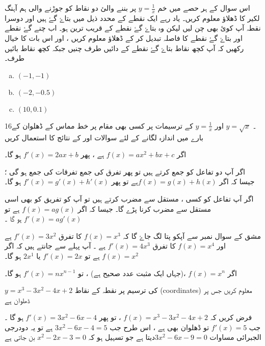 اس سوال کے ہر حصے میں خم \(y=\frac{1}{x}\) پر بننے والئ دو نقاط کو جوڑنے والی    ہم آہنگ لکیر کا ڈھلاؤ معلوم کریں۔ یاد رہے ایک نقطے کے محدد ذیل میں بتاۓ گۓ ہیں اور دوسرا نقطہ آپ کوئ بھی  چن لیں لیکن وہ بتاۓ گۓ نقطے کے قریب ترین ہو۔ اب چنے گۓ نقطے اور بتاۓ گۓ نقطے کا فاصلہ تبدیل کر کے ڈھلاؤ معلوم کریں ، اور اس بات کا خیال رکھیں کہ آپ کچھ نقاط بتاۓ گۓ نقطے کے دائیں طرف چنیں جبکہ کچھ نقاط بائیں طرف۔
\begin{multicols}{3}     
\begin{enumerate}[a.]
\item   \(   (-1,-1)   \)
\item \(    (-2,-0.5)   \)
\item  \(   (10,0.1)   \)
\end{enumerate}
 \end{multicols}



  16۔ \(y=\sqrt{x}\) اور \(y=\frac{1}{x}\) کے ترسیمات  پر کسی بھی مقام پر خط مماس  کے ڈھلوان کے بارے میں اندازہ لگانے کے لئے سوالات   اور   کے نتائج کا استعمال کریں

 

اگر \(f(x)= ax^2 +bx +c\) ہے ، پھر  \(f'(x) = 2ax +b\) ہو گا۔

اگر آپ دو تفاعل کو  جمع کرتے ہیں تو پھر تفرق کی جمع تفرقات کی جمع ہو گی ؛
جیسا کہ اگر 
\(f(x)=g(x)+h(x)\)ہے تو پھر \(f'(x)= g'(x) +h'(x)\) ہو گا۔

اگر آپ تفاعل کو کسی ، مستقل سے مضرب کرتے ہیں تو آپ کو تفریق کو بھی اسی مستقل سے مضرب کرنا پڑے گا۔  جیسا کہ اگر  \(f(x)= ag(x)\) ہے تو \(f'(x) =ag'(x)\) ہو گا ۔

مشق کے سوال نمبر  سے آپکو پتا لگ جاۓ گا کہ \(f(x) =x^3\) کا تفرق \(f'(x)= 3x^2\) ہے اور \(f(x)=x^4\) کا تفرق \(f'(x) = 4x^3\) ہے ۔ آپ پہلے سے جانتے ہیں کہ اگر \(f(x)=x^2\) ہے تو \(f'(x) = 2x\) یا \(2x^1\) ہو گا۔

اگر \(f(x)=x^n\) ،(جہاں ایک مثبت عدد صحیح ہے) ، تو \(f'(x) = nx^{n-1}\) ہو گا۔

\(y=x^3 -3x^2 -4x +2\) کی ترسیم پر نقطہ کے نقاط (coordinates) معلوم کریں جس پر ڈھلوان  ہے

فرض کریں کہ \(f(x)=x^3 -3x^2 -4x +2 \) ، تو پھر \(f'(x)= 3x^2 -6x -4\)  ہو گا   ۔ جب \(f'(x)=5\) تو ڈھلوان بھی  ہے  ، اس طرح جب 
\(3x^2 -6x -4=5\) ہے تو یہ دودرجی الجبرائی مساوات 
\(3x^2 -6x -9=0\)دیتا ہے جو تسہیل ہو کہ \(x^2 -2x -3=0\) بن جاتی ہے   
 
